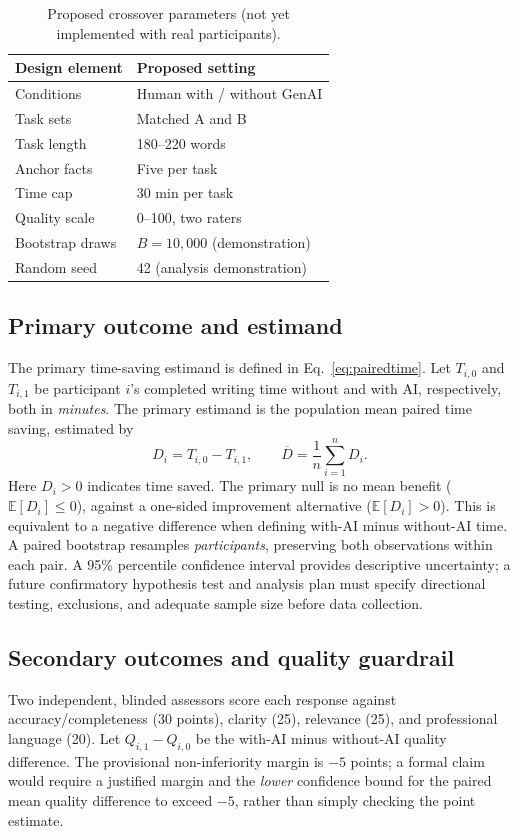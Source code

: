 \begin{table}[t]
  \centering
  \caption{Proposed crossover parameters (not yet implemented with real participants).}
  \label{tab:design}
  \begin{tabular}{@{}ll@{}}
    \toprule
    Design element & Proposed setting \\
    \midrule
    Conditions & Human with / without GenAI \\
    Task sets & Matched A and B \\
    Task length & 180--220 words \\
    Anchor facts & Five per task \\
    Time cap & 30 min per task \\
    Quality scale & 0--100, two raters \\
    Bootstrap draws & $B=10{,}000$ (demonstration) \\
    Random seed & 42 (analysis demonstration) \\
    \bottomrule
  \end{tabular}
\end{table}

\subsection{Primary outcome and estimand}
The primary time-saving estimand is defined in
Eq.~\ref{eq:pairedtime}.
Let $T_{i,0}$ and $T_{i,1}$ be participant $i$'s completed writing time without and with AI, respectively, both in \emph{minutes}. The primary estimand is the population mean paired time saving, estimated by
\begin{equation}\label{eq:pairedtime}
  D_i=T_{i,0}-T_{i,1},\qquad
  \overline{D}=\frac{1}{n}\sum_{i=1}^{n}D_i.
\end{equation}
Here $D_i>0$ indicates time saved. The primary null is no mean benefit ($\mathbb{E}[D_i]\leq 0$), against a one-sided improvement alternative ($\mathbb{E}[D_i]>0$). This is equivalent to a negative difference when defining with-AI minus without-AI time. A paired bootstrap resamples \emph{participants}, preserving both observations within each pair. A 95\% percentile confidence interval provides descriptive uncertainty; a future confirmatory hypothesis test and analysis plan must specify directional testing, exclusions, and adequate sample size before data collection.

\subsection{Secondary outcomes and quality guardrail}
Two independent, blinded assessors score each response against accuracy/completeness (30 points), clarity (25), relevance (25), and professional language (20). Let $Q_{i,1}-Q_{i,0}$ be the with-AI minus without-AI quality difference. The provisional non-inferiority margin is $-5$ points; a formal claim would require a justified margin and the \emph{lower} confidence bound for the paired mean quality difference to exceed $-5$, rather than simply checking the point estimate.

